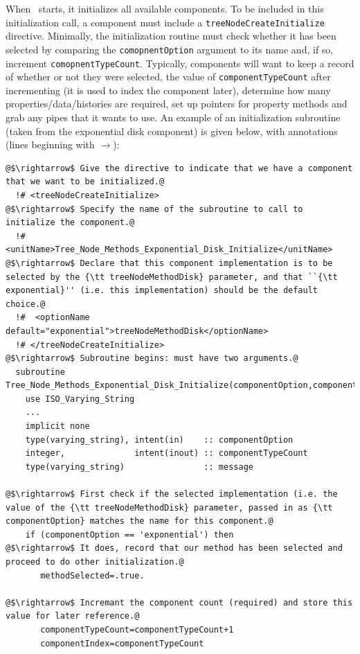 When \glc\ starts, it initializes all available components. To be included in this initialization call, a component must include a {\tt treeNodeCreateInitialize} directive. Minimally, the initialization routine must check whether it has been selected by comparing the {\tt comopnentOption} argument to its name and, if so, increment {\tt comopnentTypeCount}. Typically, components will want to keep a record of whether or not they were selected, the value of {\tt componentTypeCount} after incrementing (it is used to index the component later), determine how many properties/data/histories are required, set up pointers for property methods and grab any pipes that it wants to use. An example of an initialization subroutine (taken from the exponential disk component) is given below, with annotations (lines beginning with $\rightarrow$):
\begin{lstlisting}[escapechar=@,breaklines,prebreak=\&,postbreak=\&]
@$\rightarrow$ Give the directive to indicate that we have a component that we want to be initialized.@
  !# <treeNodeCreateInitialize>
@$\rightarrow$ Specify the name of the subroutine to call to initialize the component.@
  !#  <unitName>Tree_Node_Methods_Exponential_Disk_Initialize</unitName>
@$\rightarrow$ Declare that this component implementation is to be selected by the {\tt treeNodeMethodDisk} parameter, and that ``{\tt exponential}'' (i.e. this implementation) should be the default choice.@
  !#  <optionName default="exponential">treeNodeMethodDisk</optionName>
  !# </treeNodeCreateInitialize>
@$\rightarrow$ Subroutine begins: must have two arguments.@
  subroutine Tree_Node_Methods_Exponential_Disk_Initialize(componentOption,componentTypeCount)
    use ISO_Varying_String
    ...
    implicit none
    type(varying_string), intent(in)    :: componentOption
    integer,              intent(inout) :: componentTypeCount
    type(varying_string)                :: message

@$\rightarrow$ First check if the selected implementation (i.e. the value of the {\tt treeNodeMethodDisk} parameter, passed in as {\tt componentOption} matches the name for this component.@
    if (componentOption == 'exponential') then
@$\rightarrow$ It does, record that our method has been selected and proceed to do other initialization.@
       methodSelected=.true.

@$\rightarrow$ Incremant the component count (required) and store this value for later reference.@
       componentTypeCount=componentTypeCount+1
       componentIndex=componentTypeCount


\end{lstlisting}
